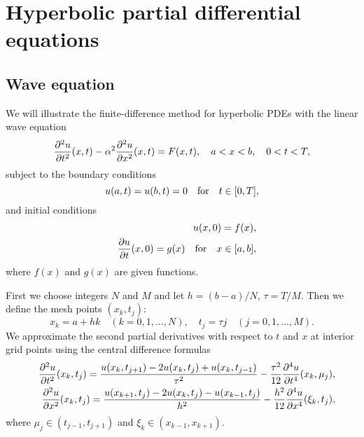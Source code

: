 %
%
%


\section{Hyperbolic partial differential equations}


\subsection{Wave equation}

 
We will illustrate the finite-difference
method for hyperbolic PDEs with the linear wave equation
\begin{equation}
\frac{{\partial}^{2} u}{{\partial} t^{2}}(x,t) - \alpha^{2}\frac{{\partial}^{2} u}{{\partial}
x^{2}}(x,t)=F(x,t), \quad a<x< b, \quad 0<t<T,   \label{1}
\end{equation}
subject to the boundary conditions
\begin{equation}
u(a, t) = u(b, t)=0 \quad \hbox{for} \quad t\in[0,T],   \label{2}
\end{equation}
and initial conditions
\begin{eqnarray}
&&u(x, 0) = f(x), \label{3} \\
&&\frac{{\partial} u}{{\partial} t}(x,0)=g(x)  \quad \hbox{for} \quad x\in[a,b],
\label{4}
\end{eqnarray}
where $f(x)$ and $g(x)$ are given functions.

   
First we choose integers $N$ and $M$ and
let $h=(b-a)/N$, $\tau=T/M$. Then we define the mesh points
$(x_{k}, t_{j})$:
\[
x_{k}=a+hk \quad(k=0,1,\dots,N), \quad t_{j}=\tau j
\quad(j=0,1,\dots,M).
\]
We approximate the second partial derivatives with respect to $t$
and $x$ at interior grid points using the central difference
formulas
\begin{eqnarray}
&&\frac{{\partial}^{2} u}{{\partial} t^{2}}(x_{k},t_{j})=
\frac{u(x_{k},t_{j+1})-2u(x_{k},t_{j})+u(x_{k},t_{j-1})}{\tau^{2}}-
\frac{\tau^{2}}{12}\frac{{\partial}^{4} u}{{\partial} t^{4}}(x_{k}, \mu_{j}), \nonumber \\
&&\frac{{\partial}^{2} u}{{\partial} x^{2}}(x_{k},t_{j})= \frac{u(x_{k+1},
t_{j})-2u(x_{k},t_{j})-u(x_{k-1}, t_{j})}{h^{2}}-
\frac{h^{2}}{12}\frac{{\partial}^{4} u}{{\partial} x^{4}}(\xi_{k}, t_{j}),
\nonumber
\end{eqnarray}
where $\mu_{j}\in(t_{j-1},t_{j+1})$ and
$\xi_{k}\in(x_{k-1},x_{k+1})$.

